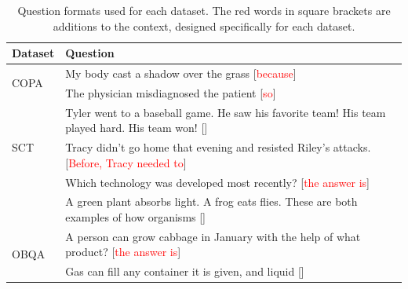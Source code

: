 \begin{table}[h]
    \centering
    \small
    \setlength{\tabcolsep}{2pt} 
    \begin{tabular}{lp{5.9cm}}
    \toprule
    \textbf{Dataset} & \textbf{Question} \\ 
    \midrule
    \multirow{2}{*}{COPA} & My body cast a shadow over the grass [\textcolor{red}{because}] \\
    \hhline{~-}
    & The physician misdiagnosed the patient [\textcolor{red}{so}]\\
    \midrule
    \multirow{3}{*}{SCT} & Tyler went to a baseball game. He saw his favorite team! His team played hard. His team won! []\\
    \midrule
    \multirow{2}{*}{SocialIQa} & Tracy didn't go home that evening and resisted Riley's attacks. [\textcolor{red}{Before, Tracy needed to}]\\
    \midrule
    \multirow{4}{*}{ARC} & Which technology was developed most recently? [\textcolor{red}{the answer is}]\\
    \hhline{~-}
    & A green plant absorbs light. A frog eats flies. These are both examples of how organisms []\\
    \midrule
    \multirow{4}{*}{OBQA} & A person can grow cabbage in January with the help of what product? [\textcolor{red}{the answer is}]\\
    \hhline{~-}
    & Gas can fill any container it is given, and liquid []\\
    \bottomrule
    \end{tabular}
    \caption{Question formats used for each dataset. The red words in square brackets are additions to the context, designed specifically for each dataset.}
    \label{tab:converted_question}
\end{table}